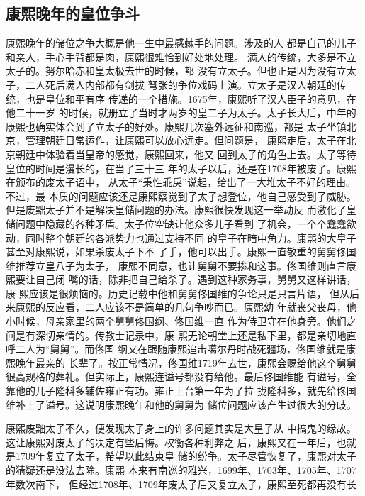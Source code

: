 \subsection{康熙晚年的皇位争斗}
\par
康熙晚年的储位之争大概是他一生中最感棘手的问题。涉及的人%
都是自己的儿子和亲人，手心手背都是肉，康熙很难恰到好处地处理。%
满人的传统，大多是不立太子的。努尔哈赤和皇太极去世的时候，都%
没有立太子。但也正是因为没有立太子，二人死后满人内部都有剑拔%
弩张的争位戏码上演。立太子是汉人朝廷的传统，也是皇位和平有序%
传递的一个措施。1675年，康熙听了汉人臣子的意见，在他二十一岁%
的时候，就册立了当时才两岁的皇二子为太子。太子长大后，中年的%
康熙也确实体会到了立太子的好处。康熙几次塞外远征和南巡，都是%
太子坐镇北京，管理朝廷日常运作，让康熙可以放心远走。但问题是，%
康熙走后，太子在北京朝廷中体验着当皇帝的感觉，康熙回来，他又%
回到太子的角色上去。太子等待皇位的时间是漫长的，在当了三十三%
年的太子以后，还是在1708年被废了。康熙在颁布的废太子诏中，%
从太子“秉性乖戾”说起，给出了一大堆太子不好的理由。不过，最%
本质的问题应该还是康熙察觉到了太子想登位，他自己感受到了威胁。%
但是废黜太子并不是解决皇储问题的办法。康熙很快发现这一举动反%
而激化了皇储问题中隐藏的各种矛盾。太子位空缺让他众多儿子看到%
了机会，一个个蠢蠢欲动，同时整个朝廷的各派势力也通过支持不同%
的皇子在暗中角力。康熙的大皇子甚至对康熙说，如果杀废太子下不%
了手，他可以出手。康熙一直敬重的舅舅佟国维推荐立皇八子为太子，%
康熙不同意，也让舅舅不要掺和这事。佟国维则直言康熙要让自己闭%
嘴的话，除非把自己给杀了。遇到这种家务事，舅舅又这样讲话，康%
熙应该是很烦恼的。历史记载中他和舅舅佟国维的争论只是只言片语，%
但从后来康熙的反应看，二人应该不是简单的几句争吵而已。康熙幼%
年就丧父丧母，他小时候，母亲家里的两个舅舅佟国纲、佟国维一直%
作为侍卫守在他身旁。他们之间是有深切亲情的。传教士记录中，康%
熙无论朝堂上还是私下里，都是亲切地直呼二人为“舅舅”。而佟国%
纲又在跟随康熙追击噶尔丹时战死疆场，佟国维就是康熙晚年最亲的%
长辈了。按正常情况，佟国维1719年去世，康熙会赐给他这个舅舅%
很高规格的葬礼。但实际上，康熙连谥号都没有给他。最后佟国维能%
有谥号，全靠他的儿子隆科多辅佐雍正有功。雍正上台第一年为了拉%
拢隆科多，就先给佟国维补上了谥号。这说明康熙晚年和他的舅舅为%
储位问题应该产生过很大的分歧。%
\par
康熙废黜太子不久，便发现太子身上的许多问题其实是大皇子从%
中搞鬼的缘故。这让康熙对废太子的决定有些后悔。权衡各种利弊之%
后，康熙又在一年后，也就是1709年复立了太子，希望以此结束皇%
储的纷争。太子尽管恢复了，康熙对太子的猜疑还是没法去除。康熙%
本来有南巡的雅兴，1699年、1703年、1705年、1707年数次南下，%
但经过1708年、1709年废太子后又复立太子，康熙至死都再没有长%
